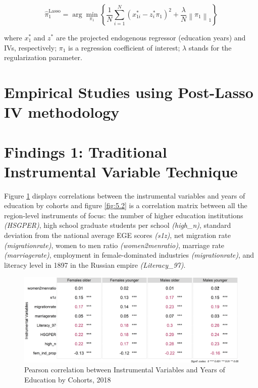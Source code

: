 \documentclass[alpha-refs]{wiley-article-04t}
\begin{document}
\begin{equation}\hat{\pi}_{1}^{\text {Lasso}}=\arg \min_{\pi_{1}}\left\{\frac{1}{N} \sum_{i=1}^{N}\left(x_{1 i}^{*} -z_{i}^{*} \pi_{1}\right)^{2} +\frac{\lambda}{N}\left\|\pi_{1}\right\|_{1}\right\}\end{equation}

\noindent
where $x_{1}^{*}$ and $z^{*}$ are the projected endogenous regressor (education years) and IVs, respectively; $\pi_{1}$ is a regression coefficient of interest; $\lambda$ stands for the regularization parameter.


\section{Empirical Studies using Post-Lasso IV methodology}

\lipsum[5]

\section{Findings 1: Traditional Instrumental Variable Technique}

Figure \ref{fig:5.1} displays correlations between the instrumental variables and years of education by cohorts and figure \ref{fig:5.2} is a correlation matrix between all the region-level instruments of focus: the number of higher education institutions \textit{(HSGPER)}, high school graduate students per school \textit{(high\_n)}, standard deviation from the national average EGE scores \textit{(s1z)}, net migration rate \textit{(migrationrate)}, women to men ratio \textit{(women2menratio)}, marriage rate \textit{(marriagerate)}, employment in female-dominated industries \textit{(migrationrate)}, and literacy level in 1897 in the Russian empire \textit{(Literacy\_97)}.


\begin{figure}[h]
	\includegraphics[width=\textwidth]{cor_by_cohorts.png}
	\caption{Pearson correlation between Instrumental Variables and Years of Education by Cohorts, 2018} \label{fig:5.1}
\end{figure}
\end{document}
